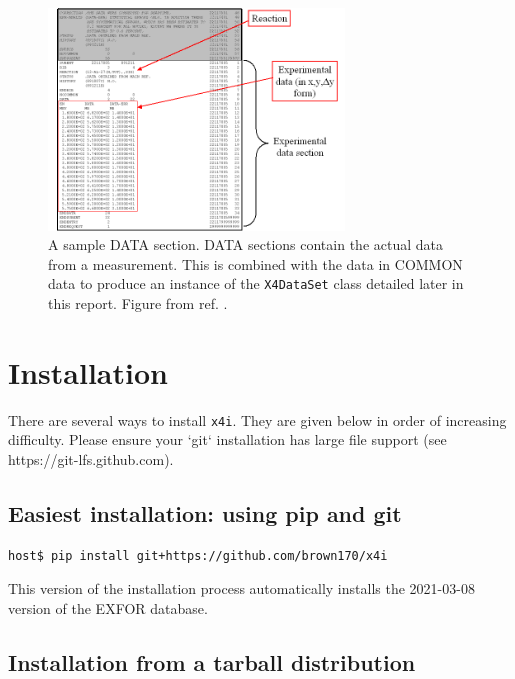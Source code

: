 \documentclass[11pt]{article}
\newcommand{\xfouri}{\texttt{x4i}}
\begin{document}
\begin{figure}[htbp]
\begin{center}
\includegraphics[width=0.7\textwidth]{figs/bib04.png}
\caption{\label{fig:5}A sample DATA section.  DATA sections contain the actual data from a measurement.   This is combined with the data in COMMON data to produce an instance of the \texttt{X4DataSet} class detailed later in this report.  Figure from ref. \cite{web}.}
\end{center}
\end{figure}

\clearpage

\section{Installation}
There are several ways to install \xfouri.  They are given below in order of increasing difficulty.
Please ensure your `git` installation has large file support (see https://git-lfs.github.com).

\subsection{Easiest installation: using pip and git}
\begin{verbatim}
host$ pip install git+https://github.com/brown170/x4i
\end{verbatim}
This version of the installation process automatically installs the 2021-03-08 version of the EXFOR database.

\subsection{Installation from a tarball distribution}
\end{document}
